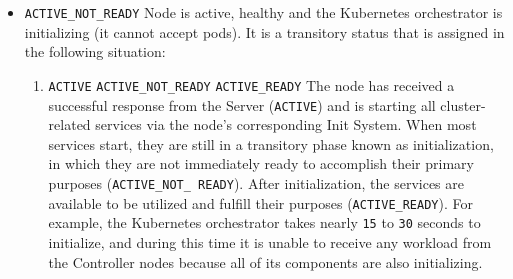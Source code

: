 \begin{itemize}
\begin{itemize}
      \item \texttt{ACTIVE\_NOT\_READY}
        \newline
        Node is active, healthy and the Kubernetes orchestrator is initializing (it
        cannot accept pods).
        \newline
        It is a transitory status that is assigned in the following situation:
        \begin{enumerate}
          \item \texttt{ACTIVE}  \texttt{ACTIVE\_NOT\_READY}
             \texttt{ACTIVE\_READY}
            \newline
            The node has received a successful response from the Server (\texttt{ACTIVE})
            and is starting all cluster-related services via the node's corresponding
            Init System. When most services start, they are still in a transitory
            phase known as initialization, in which they are not immediately
            ready to accomplish their primary purposes (\texttt{ACTIVE\_NOT\_
            READY}). After initialization, the services are available to be
            utilized and fulfill their purposes (\texttt{ACTIVE\_READY}).
            \newline
            For example, the Kubernetes orchestrator takes nearly \texttt{15} to
            \texttt{30} seconds to initialize, and during this time it is unable
            to receive any workload from the Controller nodes because all of its
            components are also initializing.
        \end{enumerate}


\end{itemize}
\end{itemize}
